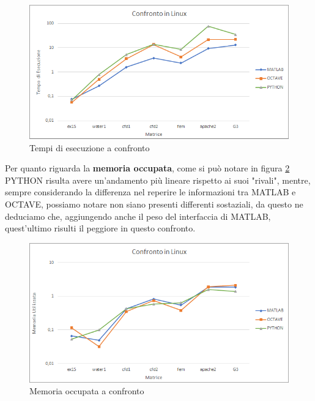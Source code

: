 \documentclass[a4paper,12pt,titlepage,oneside]{book}
\begin{document}
        \begin{figure}[ht]
            \centering
            \includegraphics[scale=0.8]{src/plot/LINUXtime.png}
            \caption{Tempi di esecuzione a confronto}
            \label{plot:timelin}
        \end{figure}
        
        \noindent Per quanto riguarda la \textbf{memoria occupata}, come si può notare in figura \ref{plot:memlin} PYTHON risulta avere un'andamento più lineare rispetto ai suoi "rivali", mentre, sempre considerando la differenza nel reperire le informazioni tra MATLAB e OCTAVE, possiamo notare non siano presenti differenti sostaziali, da questo ne deduciamo che, aggiungendo anche il peso del interfaccia di MATLAB, quest'ultimo risulti il peggiore in questo confronto.\\
        
        \begin{figure}[ht]
            \centering
            \includegraphics[scale=0.8]{src/plot/LINUXmem.png}
            \caption{Memoria occupata a confronto}
            \label{plot:memlin}
        \end{figure}
        
\end{document}
